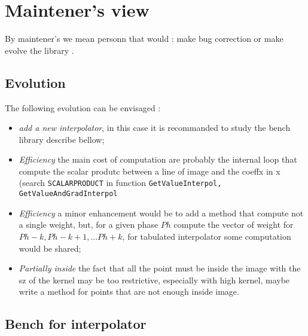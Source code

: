 
\section{Maintener's view}

By maintener's we mean personn that would : make bug correction or make evolve the library .

\label{InterpolMaintener}


\subsection{Evolution}

The following evolution can be envisaged :

\begin{itemize}
    \item \emph{add a new interpolator}, in this case it is recommanded to study the bench library describe
	    bellow;
    \item \emph{Efficiency} the main cost of computation are probably the internal loop  that compute
	    the  scalar produtc between a line of  image and the coeffx in x (search {\tt SCALARPRODUCT}
		in function {\tt GetValueInterpol, GetValueAndGradInterpol}

    \item \emph{Efficiency} a minor enhancement would be to add a method that compute not a single
	   weight, but, for a given phase $Ph$ compute the vector of weight for $Ph-k,Ph-k+1,\dots Ph+k$,
           for tabulated interpolator some computation would be shared;

   \item \emph{Partially inside} the fact that all the point must be inside the image with the sz of the kernel
	   may be too restrictive, especially with high kernel, maybe write a method for points that are not
		enough inside image.
\end{itemize}


\subsection{Bench for interpolator}

